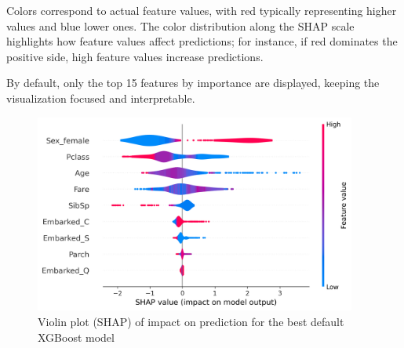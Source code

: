 \documentclass{article}%
\begin{document}
        \hspace{20px} Colors correspond to actual feature values, with red typically representing higher values and blue lower ones.
        The color distribution along the SHAP scale highlights how feature values affect predictions; for instance, 
        if red dominates the positive side, high feature values increase predictions.

        \hspace{10px} By default, only the top 15 features by importance are displayed, keeping the visualization focused and interpretable.\\


\begin{figure}[h!]%
\centering%
\includegraphics[width=400px]{XAI/XGBoost/violin_summary_plot_shap.png}%
\caption{Violin plot (SHAP) of impact on prediction for the best default XGBoost model}%
\end{figure}

%
\end{document}
